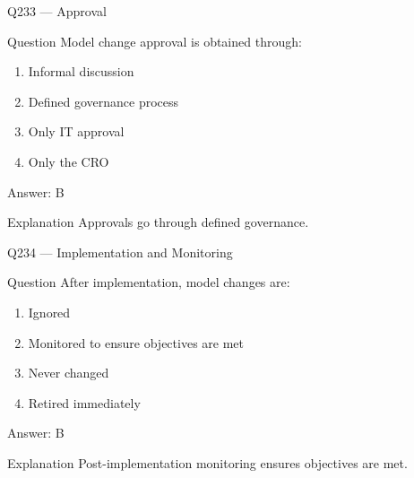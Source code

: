 \documentclass[aspectratio=169,8pt]{beamer}
\begin{document}
								\begin{frame}{Q233 --- Approval}
									\begin{block}{Question}
										Model change approval is obtained through:
										\begin{enumerate}
											\item Informal discussion
											\item Defined governance process
											\item Only IT approval
											\item Only the CRO
										\end{enumerate}
									\end{block}
									\begin{exampleblock}{Answer: B}\end{exampleblock}
									\begin{block}{Explanation}
										Approvals go through defined governance.
									\end{block}
								\end{frame}
								
								\begin{frame}{Q234 --- Implementation and Monitoring}
									\begin{block}{Question}
										After implementation, model changes are:
										\begin{enumerate}
											\item Ignored
											\item Monitored to ensure objectives are met
											\item Never changed
											\item Retired immediately
										\end{enumerate}
									\end{block}
									\begin{exampleblock}{Answer: B}\end{exampleblock}
									\begin{block}{Explanation}
										Post-implementation monitoring ensures objectives are met.
									\end{block}
								\end{frame}
								
\end{document}
